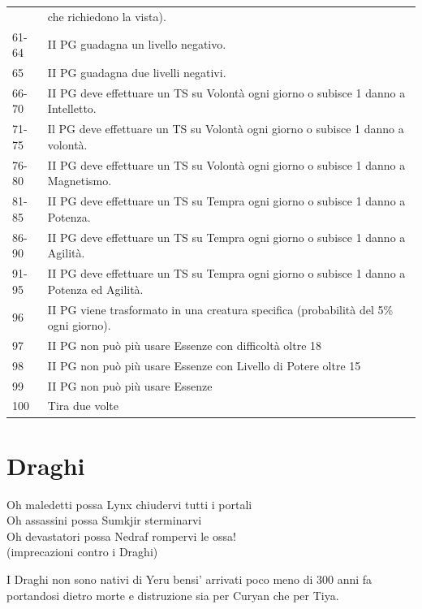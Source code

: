 \documentclass[a4paper,11pt,twoside,openany]{book}
\begin{document}
\begin{tabular}{ll}
	            & che richiedono la vista).\\
	61-64       & II PG guadagna un livello negativo.\\
	65          & II PG guadagna due livelli negativi.\\
	66-70       & II PG deve effettuare un TS su Volontà ogni giorno o subisce 1 danno a Intelletto.\\
	71-75       & Il PG deve effettuare un TS su Volontà ogni giorno o subisce 1 danno a volontà.\\
	76-80       & II PG deve effettuare un TS su Volontà ogni giorno o subisce 1 danno a Magnetismo.\\
	81-85       & II PG deve effettuare un TS su Tempra ogni giorno o subisce 1 danno a Potenza.\\
	86-90       & II PG deve effettuare un TS su Tempra ogni giorno o subisce 1 danno a Agilità.\\
	91-95       & II PG deve effettuare un TS su Tempra ogni giorno o subisce 1 danno a Potenza ed Agilità.\\
	96          & II PG viene trasformato in una creatura specifica (probabilità del 5\% ogni giorno).\\
	97          & II PG non può più usare Essenze con difficoltà oltre 18\\
	98          & II PG non può più usare Essenze con Livello di Potere oltre 15\\
	99          & II PG non può più usare Essenze\\
	100         & Tira due volte\\
\end{tabular}

\pagebreak

\section{Draghi}
\label{draghi}

\begin{tcolorbox}[enhanced,arc=5pt,boxrule=0.3pt]{
		Oh maledetti possa Lynx chiudervi tutti i portali\\
		Oh assassini possa Sumkjir sterminarvi\\
		Oh devastatori possa Nedraf rompervi le ossa!\\
		(imprecazioni contro i Draghi)}\end{tcolorbox}\medskip

I Draghi non sono nativi di Yeru bensi' arrivati poco meno di 300 anni fa portandosi dietro morte e distruzione sia per Curyan che per Tiya.
\end{document}
